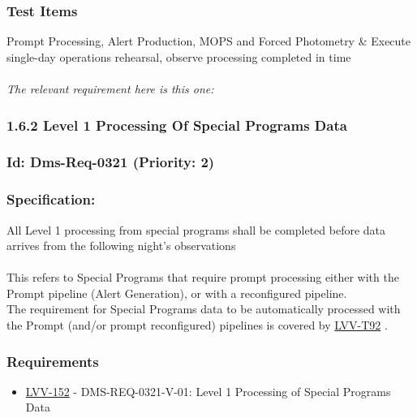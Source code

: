 \hypertarget{test-items-69}{%
\subsubsection{Test Items}\label{test-items-69}}

Prompt Processing, Alert Production, MOPS and Forced Photometry \&
Execute single-day operations rehearsal, observe processing completed in
time\\
~\\
\emph{The relevant requirement here is this one:\\
}

\hypertarget{level-1-processing-of-special-programs-data}{%
\subsubsection{1.6.2 Level 1 Processing Of Special Programs
Data}\label{level-1-processing-of-special-programs-data}}

\hypertarget{id-dms-req-0321-priority-2}{%
\subsubsection{Id: Dms-Req-0321 (Priority:
2)}\label{id-dms-req-0321-priority-2}}

\hypertarget{specification-1}{%
\subsubsection{Specification:}\label{specification-1}}

All Level 1 processing from special programs shall be completed before
data arrives from the following night's observations\\
~\\
This refers to Special Programs that require prompt processing either
with the Prompt pipeline (Alert Generation), or with a reconfigured
pipeline.\\
The requirement for Special Programs data to be automatically processed
with the Prompt (and/or prompt reconfigured) pipelines is covered by
\href{https://jira.lsstcorp.org/secure/Tests.jspa\#/testCase/LVV-T92}{LVV-T92}
.

\hypertarget{requirements-70}{%
\subsubsection{Requirements}\label{requirements-70}}

\begin{itemize}
\tightlist
\item
  \href{https://jira.lsstcorp.org/browse/LVV-152}{LVV-152} -
  DMS-REQ-0321-V-01: Level 1 Processing of Special Programs Data
\end{itemize}

